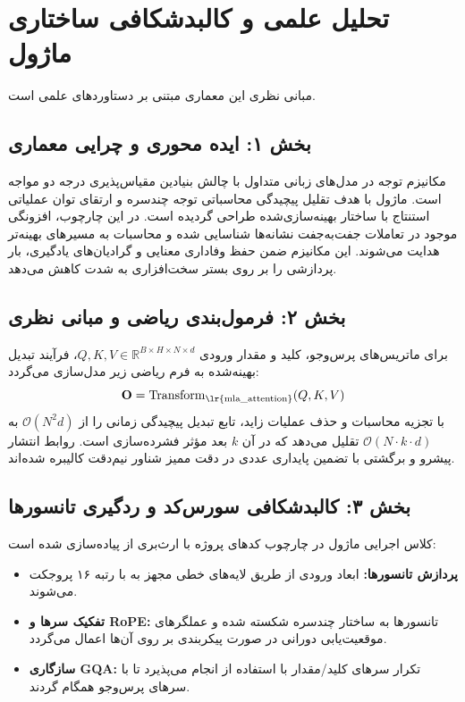 \section{تحلیل علمی و کالبدشکافی ساختاری ماژول }

مبانی نظری این معماری مبتنی بر دستاوردهای علمی \cite{deepseek2024mla} است.
\label{sec:mla_attention}

\subsection*{بخش ۱: ایده محوری و چرایی معماری }
مکانیزم توجه در مدل‌های زبانی متداول با چالش بنیادین مقیاس‌پذیری درجه دو مواجه است. ماژول  با هدف تقلیل پیچیدگی محاسباتی توجه چندسره و ارتقای توان عملیاتی استنتاج با ساختار بهینه‌سازی‌شده طراحی گردیده است. در این چارچوب، افزونگی موجود در تعاملات جفت‌به‌جفت نشانه‌ها شناسایی شده و محاسبات به مسیرهای بهینه‌تر هدایت می‌شوند. این مکانیزم ضمن حفظ وفاداری معنایی و گرادیان‌های یادگیری، بار پردازشی را بر روی بستر سخت‌افزاری به شدت کاهش می‌دهد.

\subsection*{بخش ۲: فرمول‌بندی ریاضی و مبانی نظری }
برای ماتریس‌های پرس‌وجو، کلید و مقدار ورودی $Q, K, V \in \mathbb{R}^{B \times H \times N \times d}$، فرآیند تبدیل بهینه‌شده به فرم ریاضی زیر مدل‌سازی می‌گردد:
\begin{equation}
\mathbf{O} = \operatorname{Transform}_{\text{\lr{mla\_attention}}}(Q, K, V)
\end{equation}
با تجزیه محاسبات و حذف عملیات زاید، تابع تبدیل پیچیدگی زمانی را از $\mathcal{O}(N^2 d)$ به $\mathcal{O}(N \cdot k \cdot d)$ تقلیل می‌دهد که در آن $k$ بعد مؤثر فشرده‌سازی است. روابط انتشار پیشرو و برگشتی با تضمین پایداری عددی در دقت ممیز شناور نیم‌دقت  کالیبره شده‌اند.

\subsection*{بخش ۳: کالبدشکافی سورس‌کد و ردگیری تانسورها }
کلاس اجرایی ماژول در چارچوب کدهای پروژه با ارث‌بری از  پیاده‌سازی شده است:
\begin{itemize}
    \item \textbf{پردازش تانسورها:} ابعاد ورودی \lr{$[B, N, D]$} از طریق لایه‌های خطی مجهز به  با رتبه ۱۶ پروجکت می‌شوند.
    \item \textbf{تفکیک سرها و RoPE:} تانسورها به ساختار چندسره \lr{$[B, H, N, d]$} شکسته شده و عملگرهای موقعیت‌یابی دورانی در صورت پیکربندی بر روی آن‌ها اعمال می‌گردد.
    \item \textbf{سازگاری GQA:} تکرار سرهای کلید/مقدار با استفاده از  انجام می‌پذیرد تا با سرهای پرس‌وجو همگام گردند.
\end{itemize}

